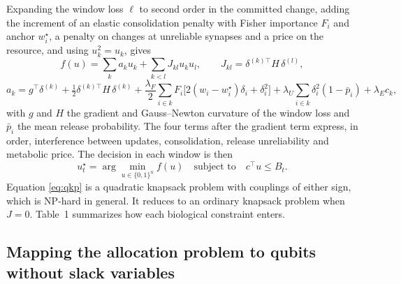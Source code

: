 Expanding the window loss $\ell$ to second order in the committed change, adding the increment of an elastic consolidation penalty\cite{kirkpatrick2017} with Fisher importance $F_{i}$ and anchor $w_{i}^{\star}$, a penalty on changes at unreliable synapses and a price on the resource, and using $u_{k}^{2}=u_{k}$, gives
\begin{equation}
f(u)=\sum_{k}a_{k}u_{k}+\sum_{k<l}J_{kl}u_{k}u_{l},\qquad J_{kl}=\delta^{(k)\top}H\,\delta^{(l)},
\label{eq:f}
\end{equation}
\begin{equation}
a_{k}=g^{\top}\delta^{(k)}+\tfrac{1}{2}\delta^{(k)\top}H\,\delta^{(k)}+\frac{\lambda_{F}}{2}\sum_{i\in k}F_{i}\big[2(w_{i}-w_{i}^{\star})\delta_{i}+\delta_{i}^{2}\big]+\lambda_{U}\sum_{i\in k}\delta_{i}^{2}(1-\bar p_{i})+\lambda_{E}c_{k},
\label{eq:a}
\end{equation}
with $g$ and $H$ the gradient and Gauss--Newton curvature of the window loss and $\bar p_{i}$ the mean release probability. The four terms after the gradient term express, in order, interference between updates, consolidation, release unreliability and metabolic price. The decision in each window is then
\begin{equation}
u_{t}^{\star}=\arg\min_{u\in\{0,1\}^{n}}f(u)\quad\text{subject to}\quad c^{\top}u\le B_{t}.
\label{eq:qkp}
\end{equation}
Equation \eqref{eq:qkp} is a quadratic knapsack problem with couplings of either sign, which is NP-hard in general\cite{pisinger2007}. It reduces to an ordinary knapsack problem when $J=0$. Table~1 summarizes how each biological constraint enters.

\subsection*{Mapping the allocation problem to qubits without slack variables}

